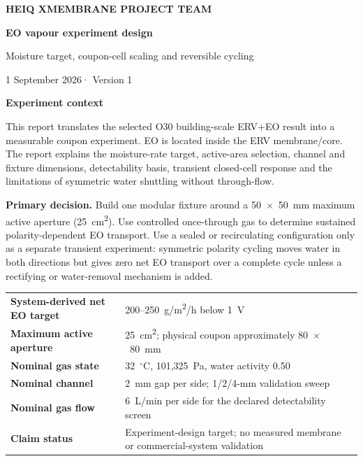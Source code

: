 \documentclass[10pt,a4paper]{article}
\newcommand{\sans}{\fontfamily{qhv}\selectfont}
\newcommand{\reportdate}{1 September 2026}
\newcommand{\reportversion}{Version 1}
\begin{document}
\thispagestyle{empty}
\vspace*{7mm}
\begin{tcolorbox}[enhanced,colback=Navy,colframe=Navy,boxrule=0pt,arc=0mm,left=12mm,right=12mm,top=12mm,bottom=12mm]
{\sans\bfseries\large\color{white}HEIQ XMEMBRANE PROJECT TEAM}\par
\vspace{8mm}
{\sans\bfseries\fontsize{27}{31}\selectfont\color{white}EO vapour experiment design}\par
\vspace{2mm}
{\sans\fontsize{17}{20}\selectfont\color{white}Moisture target, coupon-cell scaling and reversible cycling}\par
\vspace{7mm}
{\sans\large\color{white}\reportdate\quad · \quad\reportversion}
\end{tcolorbox}

\vspace{10mm}
{\sans\bfseries\Large\color{Navy}Experiment context}\par
\vspace{4mm}
This report translates the selected O30 building-scale ERV+EO result into a
measurable coupon experiment. EO is located inside the ERV membrane/core. The
report explains the moisture-rate target, active-area selection, channel and
fixture dimensions, detectability basis, transient closed-cell response and
the limitations of symmetric water shuttling without through-flow.

\begin{mainbox}
\textbf{Primary decision.} Build one modular fixture around a 50~$\times$~50~mm
maximum active aperture (25~cm\textsuperscript{2}). Use controlled once-through
gas to determine sustained polarity-dependent EO transport. Use a sealed or
recirculating configuration only as a separate transient experiment: symmetric
polarity cycling moves water in both directions but gives zero net EO transport
over a complete cycle unless a rectifying or water-removal mechanism is added.
\end{mainbox}

\vfill
\begin{tabularx}{\textwidth}{@{}lY@{}}
\textbf{System-derived net EO target} & 200--250~g/m\textsuperscript{2}/h below 1~V \\
\textbf{Maximum active aperture} & 25~cm\textsuperscript{2}; physical coupon approximately 80~$\times$~80~mm \\
\textbf{Nominal gas state} & 32~$^\circ$C, 101,325~Pa, water activity 0.50 \\
\textbf{Nominal channel} & 2~mm gap per side; 1/2/4-mm validation sweep \\
\textbf{Nominal gas flow} & 6~L/min per side for the declared detectability screen \\
\textbf{Claim status} & Experiment-design target; no measured membrane or commercial-system validation \\
\end{tabularx}
\end{document}
